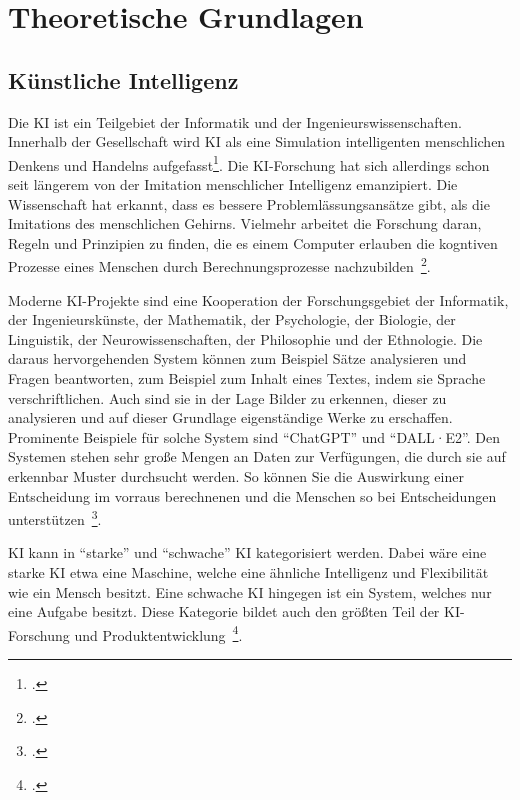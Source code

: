 \newpage
\section{Theoretische Grundlagen} \label{grundlange}

\subsection{Künstliche Intelligenz}

Die \ac{KI} ist ein Teilgebiet der Informatik und der Ingenieurswissenschaften. Innerhalb der Gesellschaft wird \ac{KI} als eine Simulation intelligenten 
menschlichen Denkens und Handelns aufgefasst\footcite[][]{Mainzer.2019}. 
Die KI-Forschung hat sich allerdings schon seit längerem von der Imitation menschlicher Intelligenz emanzipiert. 
Die Wissenschaft hat erkannt, dass es bessere Problemlässungsansätze gibt, als die Imitations des menschlichen Gehirns.
Vielmehr arbeitet die Forschung daran, Regeln und Prinzipien zu finden, die es einem Computer erlauben die kogntiven Prozesse eines Menschen durch Berechnungsprozesse 
nachzubilden~\footcite[\vglf][]{Lenzen.2020}.

Moderne KI-Projekte sind eine Kooperation der Forschungsgebiet der Informatik, der Ingenieurskünste, der Mathematik, der Psychologie, der Biologie, der Linguistik,
der Neurowissenschaften, der Philosophie und der Ethnologie.
Die daraus hervorgehenden System können zum Beispiel Sätze analysieren und Fragen beantworten, zum Beispiel zum Inhalt eines Textes, indem sie Sprache verschriftlichen.
Auch sind sie in der Lage Bilder zu erkennen, dieser zu analysieren und auf dieser Grundlage eigenständige Werke zu erschaffen.
Prominente Beispiele für solche System sind \enquote{ChatGPT} und \enquote{DALL·E2}.
Den Systemen stehen sehr große Mengen an Daten zur Verfügungen, die durch sie auf erkennbar Muster durchsucht werden. So können Sie die Auswirkung einer Entscheidung im vorraus 
berechnenen und die Menschen so bei Entscheidungen unterstützen~\footcite[\vglf][]{Lenzen.2020}.

\ac{KI} kann in \enquote{starke} und \enquote{schwache} \ac{KI} kategorisiert werden. Dabei wäre eine starke \ac{KI} etwa eine Maschine,
welche eine ähnliche Intelligenz und Flexibilität wie ein Mensch besitzt. Eine schwache \ac{KI} hingegen ist ein System, welches nur eine Aufgabe besitzt.
Diese Kategorie bildet auch den größten Teil der KI-Forschung und Produktentwicklung~\footcite[\vglf][]{Lenzen.2020}.

